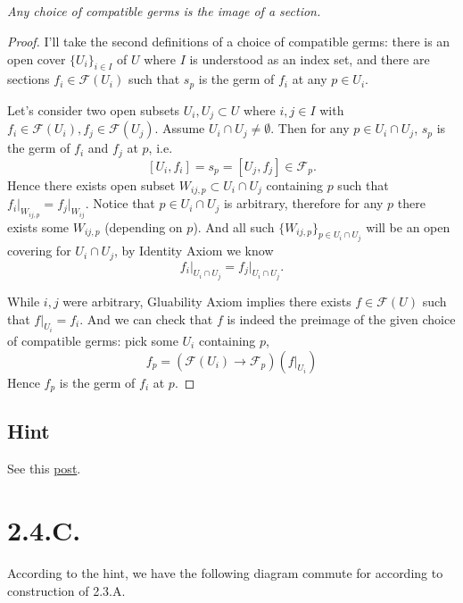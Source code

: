 \subsection{}
\textit{Any choice of compatible germs is the image of a section.}
\begin{proof}
	I'll take the second definitions of a choice of compatible germs: there is an open cover $\{U_i\}_{i\in I}$ of $U$ where $I$ is understood as an index set, and there are sections $f_i\in\mathscr F(U_i)$ such that $s_p$ is the germ of $f_i$ at any $p\in U_i$.

	
	Let's consider two open subsets $U_i,U_j\subset U$ where $i,j\in I$ with $f_i\in \mathscr F(U_i), f_j\in\mathscr F(U_j)$. Assume $U_i\cap U_j\neq\emptyset$. Then for any $p\in U_i\cap U_j$, $s_p$ is the germ of $f_i$ and $f_j$ at $p$, i.e. 
	\[[U_i,f_i]=s_p=[U_j,f_j]\in\mathscr F_p.\] Hence there exists open subset $W_{ij,p}\subset U_i\cap U_j$ containing $p$ such that $f_i\vert_{W_{ij,p}}=f_j\vert_{W_{ij}}$. Notice that $p\in U_i\cap U_j$ is arbitrary, therefore for any $p$ there exists some $W_{ij,p}$ (depending on $p$). And all such $\{W_{ij,p}\}_{p\in U_i\cap U_j}$ will be an open covering for $U_i\cap U_j$, by Identity Axiom we know \[f_i\vert_{U_i\cap U_j}=f_j\vert_{U_i\cap U_j}.\]

	While $i,j$ were arbitrary, Gluability Axiom implies there exists $f\in\mathscr F(U)$ such that $f\vert_{U_i}=f_i$. And we can check that $f$ is indeed the preimage of the given choice of compatible germs: pick some $U_i$ containing $p$, \[f_p=(\mathscr F(U_i)\to \mathscr F_p)(f\vert_{U_i})\] Hence $f_p$ is the germ of $f_i$ at $p$. 

\end{proof}

\subsection{Hint}

See this \href{https://math.stackexchange.com/questions/3587877/showing-that-compatible-germs-are-the-image-of-a-section}{post}.

\section{2.4.C.}\label{2.4.C.}

According to the hint, we have the following diagram commute for according to construction of 2.3.A.

